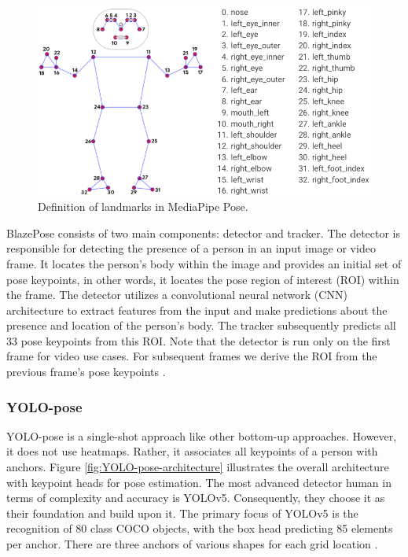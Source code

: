 \begin{figure}[ht]
  \centering
  \includegraphics[scale=0.4]{gambar/mediapipe_landmark.png}
  \caption{Definition of landmarks in MediaPipe Pose.}
  \label{fig:mediapipe-landmark}
\end{figure}

BlazePose consists of two main components: detector and tracker. The detector is responsible for detecting the presence of a person in an input image or video frame. It locates the person's body within the image and provides an initial set of pose keypoints, in other words, it locates the pose region of interest (ROI) within the frame.
The detector utilizes a convolutional neural network (CNN) architecture to extract features from the input and make predictions about the presence and location of the person's body. The tracker subsequently predicts all 33 pose keypoints from this ROI. Note that the detector is run only on the first frame for video use cases. For subsequent frames we derive the ROI from the previous frame's pose keypoints \parencite{url:BlazePose}.

\subsubsection{YOLO-pose}
\label{subsubsec:yolopose}

YOLO-pose is a single-shot approach like other bottom-up approaches. However, it does not use heatmaps. Rather, it associates all keypoints of a person with anchors. Figure \ref{fig:YOLO-pose-architecture} illustrates the overall architecture with keypoint
heads for pose estimation. The most advanced detector human in terms of complexity and accuracy is YOLOv5. Consequently, they choose it as their foundation and build upon it.
The primary focus of YOLOv5 is the recognition of 80 class COCO objects, with the box head predicting 85 elements per anchor. There are three anchors of various shapes for each grid location \parencite{maji2022yolopose}.

